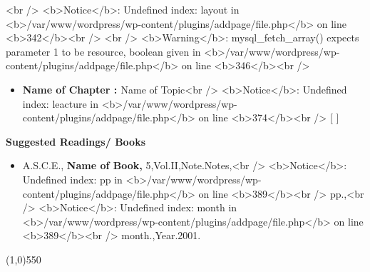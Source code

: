 \documentclass{article}
\begin{document}
\linebreak\linebreak\linebreak
<br />
<b>Notice</b>:  Undefined index: layout in <b>/var/www/wordpress/wp-content/plugins/addpage/file.php</b> on line <b>342</b><br />
<br />
<b>Warning</b>:  mysql_fetch_array() expects parameter 1 to be resource, boolean given in <b>/var/www/wordpress/wp-content/plugins/addpage/file.php</b> on line <b>346</b><br />

\color{black}
\begin{itemize}
\item {\color{black}\large{\bf{Name of Chapter : }}}\color{black}Name of Topic<br />
<b>Notice</b>:  Undefined index: leacture in <b>/var/www/wordpress/wp-content/plugins/addpage/file.php</b> on line <b>374</b><br />
[  ]\end{itemize}
\begin{flushleft}
{\color{black}\bf{Suggested Readings/ Books}}
\end{flushleft}
	
\begin{itemize}
\item  \color{black} A.S.C.E., \textbf{Name of Book,} 5,Vol.II,Note.Notes,<br />
<b>Notice</b>:  Undefined index: pp in <b>/var/www/wordpress/wp-content/plugins/addpage/file.php</b> on line <b>389</b><br />
pp.,<br />
<b>Notice</b>:  Undefined index: month in <b>/var/www/wordpress/wp-content/plugins/addpage/file.php</b> on line <b>389</b><br />
month.,Year.2001.
\end{itemize}
\color{black}\line(1,0){550}
\clearpage
\clearpage
\end{document}
